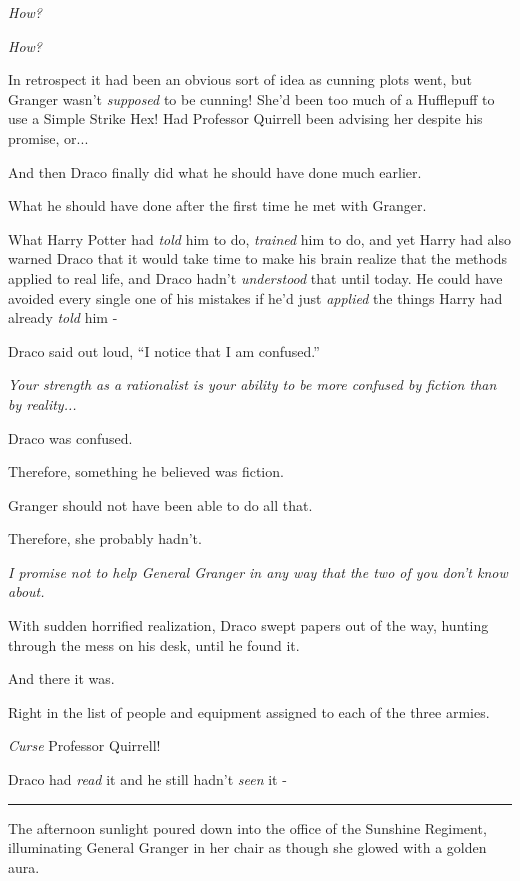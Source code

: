 \emph{How?}

\emph{How?}

In retrospect it had been an obvious sort of idea as cunning plots went,
but Granger wasn't \emph{supposed} to be cunning! She'd been too much of
a Hufflepuff to use a Simple Strike Hex! Had Professor Quirrell been
advising her despite his promise, or...

And then Draco finally did what he should have done much earlier.

What he should have done after the first time he met with Granger.

What Harry Potter had \emph{told} him to do, \emph{trained} him to do,
and yet Harry had also warned Draco that it would take time to make his
brain realize that the methods applied to real life, and Draco hadn't
\emph{understood} that until today. He could have avoided every single
one of his mistakes if he'd just \emph{applied} the things Harry had
already \emph{told} him -

Draco said out loud, ``I notice that I am confused.''

\emph{Your strength as a rationalist is your ability to be more confused
by fiction than by reality...}

Draco was confused.

Therefore, something he believed was fiction.

Granger should not have been able to do all that.

Therefore, she probably hadn't.

\emph{I promise not to help General Granger in any way that the two of
you don't know about.}

With sudden horrified realization, Draco swept papers out of the way,
hunting through the mess on his desk, until he found it.

And there it was.

Right in the list of people and equipment assigned to each of the three
armies.

\emph{Curse} Professor Quirrell!

Draco had \emph{read} it and he still hadn't \emph{seen} it -

\begin{center}\rule{3in}{0.4pt}\end{center}

The afternoon sunlight poured down into the office of the Sunshine
Regiment, illuminating General Granger in her chair as though she glowed
with a golden aura.

